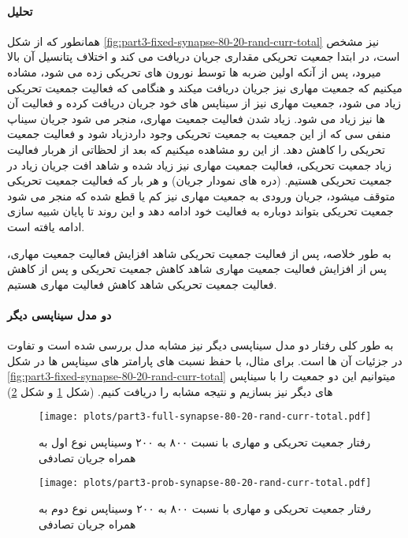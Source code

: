     \paragraph*{تحلیل}
        همانطور که از شکل 
        \ref{fig:part3-fixed-synapse-80-20-rand-curr-total}
        نیز مشخص است، در ابتدا جمعیت تحریکی مقداری جریان دریافت می کند و اختلاف پتانسیل آن بالا میرود، پس از آنکه اولین ضربه ها توسط نورون های تحریکی زده می شود، مشاده میکنیم که جمعیت مهاری نیز جریان دریافت میکند و هنگامی که فعالیت جمعیت تحریکی زیاد می شود، جمعیت مهاری نیز از سیناپس های خود جریان دریافت کرده و فعالیت آن ها نیز زیاد می شود. زیاد شدن فعالیت جمعیت مهاری، منجر می شود جریان سیناپ منفی سی که از این جمعیت به جمعیت تحریکی وجود داردزیاد شود و فعالیت جمعیت تحریکی را کاهش دهد. از این رو مشاهده میکنیم که بعد از لحظاتی از هربار فعالیت زیاد جمعیت تحریکی، فعالیت جمعیت مهاری نیز زیاد شده و شاهد افت جریان زیاد در جمعیت تحریکی هستیم.
        (دره های نمودار جریان)
        و هر بار که فعالیت جمعیت تحریکی متوقف میشود، جریان ورودی به جمعیت مهاری نیز کم یا قطع شده که منجر می شود جمعیت تحریکی بتواند دوباره به فعالیت خود ادامه دهد و این روند تا پایان شبیه سازی ادامه یافته است.

        به طور خلاصه، پس از فعالیت جمعیت تحریکی شاهد افزایش فعالیت جمعیت مهاری، پس از افزایش فعالیت جمعیت مهاری شاهد کاهش جمعیت تحریکی و پس از کاهش فعالیت جمعیت تحریکی شاهد کاهش فعالیت مهاری هستیم.

        \paragraph*{دو مدل سیناپسی دیگر}
            به طور کلی رفتار دو مدل سیناپسی دیگر نیز مشابه مدل بررسی شده است و تفاوت در جزئیات آن ها است. برای مثال، با حفظ نسبت های پارامتر های سیناپس ها در شکل 
            \ref{fig:part3-fixed-synapse-80-20-rand-curr-total}
            میتوانیم این دو جمعیت را با سیناپس های دیگر نیز بسازیم و نتیجه مشابه را دریافت کنیم.
            (شکل \ref{fig:part3-full-synapse-80-20-rand-curr-total} 
            و شکل \ref{fig:part3-prob-synapse-80-20-rand-curr-total})
            \begin{figure}[!ht]
                \centering
                \texttt{[image: plots/part3-full-synapse-80-20-rand-curr-total.pdf]} 
                \caption{رفتار جمعیت تحریکی و مهاری با نسبت ۸۰۰ به ۲۰۰ وسیناپس نوع اول به همراه جریان تصادفی}
                \label{fig:part3-full-synapse-80-20-rand-curr-total}
            \end{figure}
            \begin{figure}[!ht]
                \centering
                \texttt{[image: plots/part3-prob-synapse-80-20-rand-curr-total.pdf]} 
                \caption{رفتار جمعیت تحریکی و مهاری با نسبت ۸۰۰ به ۲۰۰ وسیناپس نوع دوم به همراه جریان تصادفی}
                \label{fig:part3-prob-synapse-80-20-rand-curr-total}
            \end{figure}

